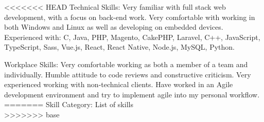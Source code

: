 
\inlineheadsection 
<<<<<<< HEAD
{Technical Skills:}
{Very familiar with full stack web development, with a focus on back-end work. Very comfortable with working in both Windows and Linux as well as developing on embedded devices. Experienced with: C, Java, PHP, Magento, CakePHP, Laravel, C++, JavaScript, TypeScript, Sass, Vue.js, React, React Native, Node.js, MySQL, Python.}

\vspace{0.5em}
\inlineheadsection 
{Workplace Skills:}
{Very comfortable working as both a member of a team and individually. Humble attitude to code reviews and constructive criticism. Very experienced working with non-technical clients. Have worked in an Agile development environment and try to implement agile into my personal workflow.}
=======
{Skill Category:}
{List of skills\\}
>>>>>>> base

\spacedhrule{1.6em}{-0.4em}

